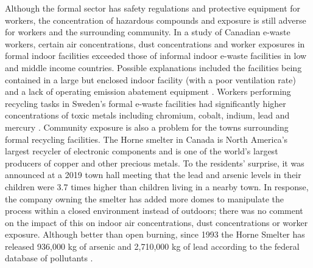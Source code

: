 \documentclass{article}
\begin{document}
Although the formal sector has safety regulations and protective equipment for workers, the concentration of hazardous compounds and exposure is still adverse for workers and the surrounding community. In a study of Canadian e-waste workers, certain air concentrations, dust concentrations and worker exposures in formal indoor facilities exceeded those of informal indoor e-waste facilities in low and middle income countries. Possible explanations included the facilities being contained in a large but enclosed indoor facility (with a poor ventilation rate) and a lack of operating emission abatement equipment \cite{nguyen2019exposure, nguyen2020can}. Workers performing recycling tasks in Sweden's formal e-waste facilities had significantly higher concentrations of toxic metals including chromium, cobalt, indium, lead and mercury \cite{julander2014formal}. Community exposure is also a problem for the towns surrounding formal recycling facilities. The Horne smelter in Canada is North America's largest recycler of electronic components and is one of the world's largest producers of copper and other precious metals. To the residents' surprise, it was announced at a 2019 town hall meeting that the lead and arsenic levels in their children were 3.7 times higher than children living in a nearby town. In response, the company owning the smelter has added more domes to manipulate the process within a closed environment instead of outdoors; there was no comment on the impact of this on indoor air concentrations, dust concentrations or worker exposure. Although better than open burning, since 1993 the Horne Smelter has released 936,000 kg of arsenic and 2,710,000 kg of lead according to the federal database of pollutants \cite{cbc2019hornesmelter}.


\end{document}
